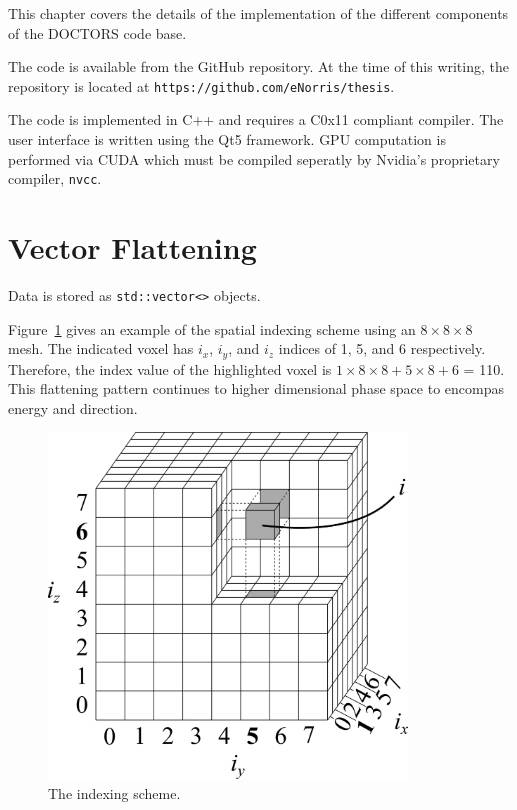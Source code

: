 
This chapter covers the details of the implementation of the different components of the DOCTORS code base.

The code is available from the GitHub repository. At the time of this writing, the repository is located at \texttt{https://github.com/eNorris/thesis}.

The code is implemented in C++ and requires a C0x11 compliant compiler. The user interface is written using the Qt5 framework. GPU computation is performed via CUDA which must be compiled seperatly by Nvidia's proprietary compiler, \texttt{nvcc}.

\section{Vector Flattening}\label{sec:flatten}

Data is stored as \texttt{std::vector<>} objects.

Figure~\ref{fig:indx_ex} gives an example of the spatial indexing scheme using an $8 \times 8 \times 8$ mesh. The indicated voxel has $i_x$, $i_y$, and $i_z$ indices of 1, 5, and 6 respectively. Therefore, the index value of the highlighted voxel is $1 \times 8 \times 8 + 5 \times 8 + 6$ = 110. This flattening pattern continues to higher dimensional phase space to encompas energy and direction.

\begin{figure}[tb]
  \begin{center}
   \includegraphics[width=3.75in]{figs/indx_ex}
  \end{center}
  \caption{The indexing scheme.}
\label{fig:indx_ex}
\end{figure}

